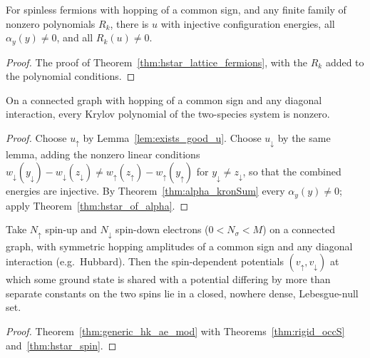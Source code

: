 \begin{lemma}
  \label{lem:exists_good_u}
  \leanok
  For spinless fermions with hopping of a common sign, and any finite family of nonzero polynomials $R_k$,
  there is $u$ with injective configuration energies, all $\alpha_y(y)\ne0$, and all $R_k(u)\ne0$.
\end{lemma}
\begin{proof}
  \leanok
  The proof of Theorem~\ref{thm:hstar_lattice_fermions}, with the $R_k$ added to the polynomial conditions.
\end{proof}

\begin{theorem}
  \label{thm:hstar_spin}
  \leanok
  On a connected graph with hopping of a common sign and any diagonal interaction, every Krylov polynomial of
  the two-species system is nonzero.
\end{theorem}
\begin{proof}
  \leanok
  Choose $u_\uparrow$ by Lemma~\ref{lem:exists_good_u}. Choose $u_\downarrow$ by the same lemma, adding the
  nonzero linear conditions
  $w_\downarrow(y_\downarrow)-w_\downarrow(z_\downarrow)\ne w_\uparrow(z_\uparrow)-w_\uparrow(y_\uparrow)$ for
  $y_\downarrow\ne z_\downarrow$, so that the combined energies are injective. By
  Theorem~\ref{thm:alpha_kronSum} every $\alpha_y(y)\ne0$; apply Theorem~\ref{thm:hstar_of_alpha}.
\end{proof}

\begin{theorem}
  \label{thm:generic_hk_spin}
  \leanok
  Take $N_\uparrow$ spin-up and $N_\downarrow$ spin-down electrons ($0<N_\sigma<M$) on a connected graph,
  with symmetric hopping amplitudes of a common sign and any diagonal interaction (e.g.\ Hubbard). Then the
  spin-dependent potentials $(v_\uparrow,v_\downarrow)$ at which some ground state is shared with a potential
  differing by more than separate constants on the two spins lie in a closed, nowhere dense,
  Lebesgue-null set.
\end{theorem}
\begin{proof}
  \leanok
  Theorem~\ref{thm:generic_hk_ae_mod} with Theorems~\ref{thm:rigid_occS} and~\ref{thm:hstar_spin}.
\end{proof}

